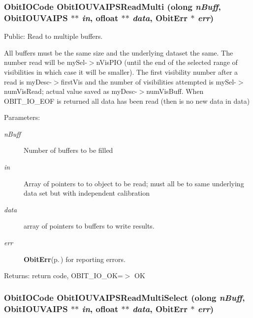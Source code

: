 \subsubsection{\setlength{\rightskip}{0pt plus 5cm}Obit\-IOCode Obit\-IOUVAIPSRead\-Multi ({\bf olong} {\em n\-Buff}, {\bf Obit\-IOUVAIPS} $\ast$$\ast$ {\em in}, {\bf ofloat} $\ast$$\ast$ {\em data}, {\bf Obit\-Err} $\ast$ {\em err})}\label{ObitIOUVAIPS_8c_a21}


Public: Read to multiple buffers. 

All buffers must be the same size and the underlying dataset the same. The number read will be my\-Sel-$>$n\-Vis\-PIO (until the end of the selected range of visibilities in which case it will be smaller). The first visibility number after a read is my\-Desc-$>$first\-Vis and the number of visibilities attempted is my\-Sel-$>$num\-Vis\-Read; actual value saved as my\-Desc-$>$num\-Vis\-Buff. When OBIT\_\-IO\_\-EOF is returned all data has been read (then is no new data in data) \begin{Desc}
\item[Parameters:]
\begin{description}
\item[{\em n\-Buff}]Number of buffers to be filled \item[{\em in}]Array of pointers to to object to be read; must all be to same underlying data set but with independent calibration \item[{\em data}]array of pointers to buffers to write results. \item[{\em err}]{\bf Obit\-Err}{\rm (p.\,\pageref{structObitErr})} for reporting errors. \end{description}
\end{Desc}
\begin{Desc}
\item[Returns:]return code, OBIT\_\-IO\_\-OK=$>$ OK \end{Desc}
\subsubsection{\setlength{\rightskip}{0pt plus 5cm}Obit\-IOCode Obit\-IOUVAIPSRead\-Multi\-Select ({\bf olong} {\em n\-Buff}, {\bf Obit\-IOUVAIPS} $\ast$$\ast$ {\em in}, {\bf ofloat} $\ast$$\ast$ {\em data}, {\bf Obit\-Err} $\ast$ {\em err})}\label{ObitIOUVAIPS_8c_a23}


